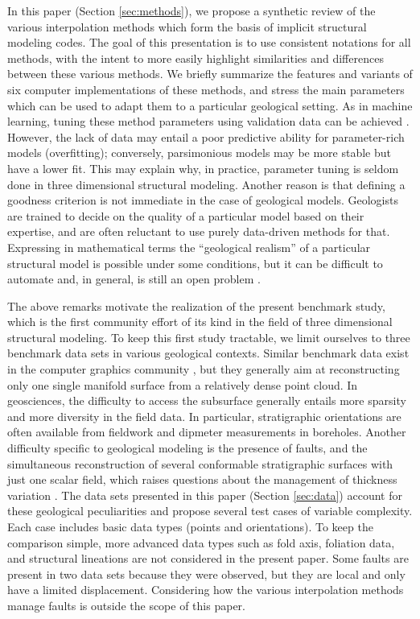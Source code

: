 \documentclass[preprint]{ring20}
\begin{document}
In this paper (Section \ref{sec:methods}), we propose a synthetic review of the various interpolation methods which form the basis of implicit structural modeling codes. The goal of this presentation is to use consistent notations for all methods, with the intent to more easily highlight similarities and differences between these various methods. We briefly summarize the features and variants of six computer implementations of these methods, and stress the main parameters which can be used to adapt them to a particular geological setting. As in machine learning, tuning these method parameters using validation data can be achieved \citep{Goncalves2017CG}. However, the lack of data may entail a poor predictive ability for parameter-rich models (overfitting); conversely, parsimonious models may be more stable but have a lower fit. This may explain why, in practice, parameter tuning is seldom done in three dimensional structural modeling. Another reason is that defining a goodness criterion is not immediate in the case of geological models. Geologists are trained to decide on the quality of a particular model based on their expertise, and are often reluctant to use purely data-driven methods for that. Expressing in mathematical terms the ``geological realism'' of a particular structural model is possible under some conditions, but it can be difficult to automate and, in general, is still an open problem \citep{Caumon2010MG,Jessell2010T}.  

The above remarks motivate the realization of the present benchmark study, which is the first community effort of its kind in the field of three dimensional structural modeling. To keep this first study tractable, we limit ourselves to three benchmark data sets in various geological contexts. Similar benchmark data exist in the computer graphics community \citep[e.g.,][]{BLNTS13}, but they generally aim at reconstructing only one single manifold surface from a relatively dense point cloud. In geosciences, the difficulty to access the subsurface generally entails more sparsity and more diversity in the field data. In particular, stratigraphic orientations are often available from fieldwork and dipmeter measurements in boreholes. Another difficulty specific to geological modeling is the presence of faults, and the simultaneous reconstruction of several conformable stratigraphic surfaces with just one scalar field, which raises questions about the management of thickness variation \citep{Laurent2016MG}. The data sets presented in this paper (Section \ref{sec:data}) account for these geological peculiarities and propose several test cases of variable complexity. Each case includes basic data types (points and orientations). To keep the comparison simple, more advanced data types such as fold axis, foliation data, and structural lineations are not considered in the present paper. Some faults are present in two data sets because they were observed, but they are local and only have a limited displacement. Considering how the various interpolation methods manage faults is outside the scope of this paper. 
\end{document}

